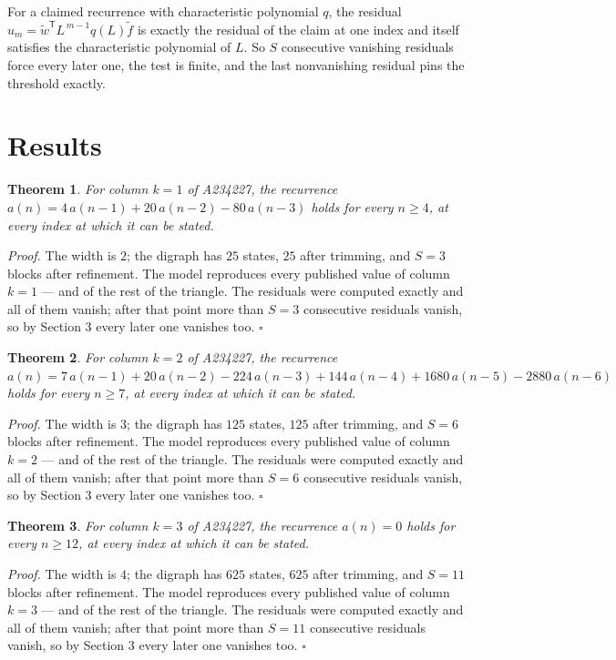 \documentclass[11pt]{article}
\newtheorem{theorem}{Theorem}
\theoremstyle{definition}
\begin{document}
For a claimed recurrence with characteristic polynomial $q$, the residual $u_m = \tilde w^{\mathsf T}L^{\,m-1}q(L)\tilde f$ is exactly the residual of the claim at one index and itself satisfies the characteristic polynomial of $L$. So $S$ consecutive vanishing residuals force every later one, the test is finite, and the last nonvanishing residual pins the threshold exactly.

\section{Results}

\begin{theorem} For column $k = 1$ of A234227, the recurrence $a(n) = 4\,a(n-1) + 20\,a(n-2) - 80\,a(n-3)$ holds for every $n \ge 4$, at every index at which it can be stated.\end{theorem}

{\itshape Proof.} The width is $2$; the digraph has $25$ states, $25$ after trimming, and $S = 3$ blocks after refinement. The model reproduces every published value of column $k = 1$ --- and of the rest of the triangle. The residuals were computed exactly and all of them vanish; after that point more than $S = 3$ consecutive residuals vanish, so by Section 3 every later one vanishes too. $\square$

\begin{theorem} For column $k = 2$ of A234227, the recurrence $a(n) = 7\,a(n-1) + 20\,a(n-2) - 224\,a(n-3) + 144\,a(n-4) + 1680\,a(n-5) - 2880\,a(n-6)$ holds for every $n \ge 7$, at every index at which it can be stated.\end{theorem}

{\itshape Proof.} The width is $3$; the digraph has $125$ states, $125$ after trimming, and $S = 6$ blocks after refinement. The model reproduces every published value of column $k = 2$ --- and of the rest of the triangle. The residuals were computed exactly and all of them vanish; after that point more than $S = 6$ consecutive residuals vanish, so by Section 3 every later one vanishes too. $\square$

\begin{theorem} For column $k = 3$ of A234227, the recurrence $a(n) = 0$ holds for every $n \ge 12$, at every index at which it can be stated.\end{theorem}

{\itshape Proof.} The width is $4$; the digraph has $625$ states, $625$ after trimming, and $S = 11$ blocks after refinement. The model reproduces every published value of column $k = 3$ --- and of the rest of the triangle. The residuals were computed exactly and all of them vanish; after that point more than $S = 11$ consecutive residuals vanish, so by Section 3 every later one vanishes too. $\square$
\end{document}
